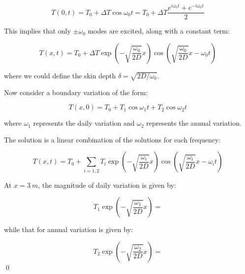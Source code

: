 \documentclass[12pt]{article}
\begin{document}
\begin{equation}
    T(0, t) = T_{0} + \Delta T \cos{\omega_{0} t} = T_{0} + \Delta T \frac{e^{i\omega_{0} t} + e^{-i\omega_{0} t}}{2}
\end{equation}

This implies that only $\pm \omega_{0}$ modes are excited, along with a constant term:

\begin{equation}
    T(x, t) = T_{0} + \Delta T \exp\left( -\sqrt{\frac{\omega_{0}}{2D}}x \right) \cos{\left( \sqrt{\frac{\omega_{0}}{2D}}x - \omega_{0} t \right)}
\end{equation}

where we could define the skin depth $\delta = \sqrt{2D/\omega_{0}}$.

Now consider a boundary variation of the form:

\begin{equation}
    T(x, 0) = T_{0} + T_{1} \cos{\omega_{1}t} + T_{2} \cos{\omega_{2}t}
\end{equation}

where $\omega_{1}$ represents the daily variation and $\omega_{2}$ represents the annual variation.

The solution is a linear combination of the solutions for each frequency:

\begin{equation}
    T(x, t) = T_{0} + \sum_{i = 1, 2} T_{i} \exp\left( -\sqrt{\frac{\omega_{i}}{2D}}x \right) \cos{\left( \sqrt{\frac{\omega_{i}}{2D}}x - \omega_{i} t \right)}
\end{equation}

At $x = \qty{3}{m}$, the magnitude of daily variation is given by:

\begin{equation}
    T_{1} \exp\left( -\sqrt{\frac{\omega_{1}}{2D}}x \right) = 
\end{equation}

while that for annual variation is given by:

\begin{equation}
    T_{2} \exp\left( -\sqrt{\frac{\omega_{2}}{2D}}x \right) =
\end{equation}
\qed
\end{document}
